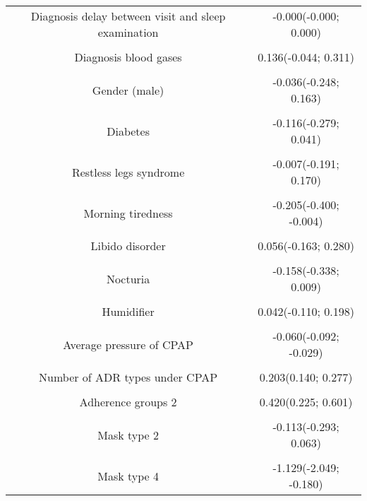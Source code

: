 \documentclass[../matsup.tex]{subfiles}
\begin{document}
\begin{longtable}[t]{cc}
Diagnosis delay between visit and sleep examination & -0.000(-0.000; 0.000)\\
\cellcolor{gray!6}{Apnea Hypopnea Index at diagnosis} & \cellcolor{gray!6}{-0.018(-0.022; -0.013)}\\
Diagnosis blood gases & 0.136(-0.044; 0.311)\\
\cellcolor{gray!6}{Diagnosis spirometry} & \cellcolor{gray!6}{0.106(-0.055; 0.278)}\\
Gender (male) & -0.036(-0.248; 0.163)\\
\cellcolor{gray!6}{Hypertension} & \cellcolor{gray!6}{-0.009(-0.171; 0.146)}\\
Diabetes & -0.116(-0.279; 0.041)\\
\cellcolor{gray!6}{Hypercholesterolemia} & \cellcolor{gray!6}{-0.100(-0.248; 0.055)}\\
Restless legs syndrome & -0.007(-0.191; 0.170)\\
\cellcolor{gray!6}{Daytime sleepiness} & \cellcolor{gray!6}{1.081(0.897; 1.273)}\\
Morning tiredness & -0.205(-0.400; -0.004)\\
\cellcolor{gray!6}{Morning headaches} & \cellcolor{gray!6}{-0.184(-0.405; 0.035)}\\
Libido disorder & 0.056(-0.163; 0.280)\\
\cellcolor{gray!6}{Night sweating} & \cellcolor{gray!6}{0.230(0.004; 0.445)}\\
Nocturia & -0.158(-0.338; 0.009)\\
\cellcolor{gray!6}{Pichot's fatigue scale} & \cellcolor{gray!6}{0.327(0.312; 0.343)}\\
Humidifier & 0.042(-0.110; 0.198)\\
\cellcolor{gray!6}{Residual apnea  hypopnea index under CPAP} & \cellcolor{gray!6}{0.042(0.023; 0.060)}\\
Average pressure of CPAP & -0.060(-0.092; -0.029)\\
\cellcolor{gray!6}{Duration since diagnosis (year)} & \cellcolor{gray!6}{-0.010(-0.057; 0.035)}\\
Number of ADR types under CPAP & 0.203(0.140; 0.277)\\
\cellcolor{gray!6}{Adherence groups 1} & \cellcolor{gray!6}{0.826(0.606; 1.031)}\\
Adherence groups 2 & 0.420(0.225; 0.601)\\
\cellcolor{gray!6}{Adherence groups 3} & \cellcolor{gray!6}{0.259(0.052; 0.468)}\\
Mask type 2 & -0.113(-0.293; 0.063)\\
\cellcolor{gray!6}{Mask type 3} & \cellcolor{gray!6}{-0.138(-0.371; 0.076)}\\
Mask type 4 & -1.129(-2.049; -0.180)\\*
\end{longtable}
\endgroup{}
\clearpage
\end{document}
